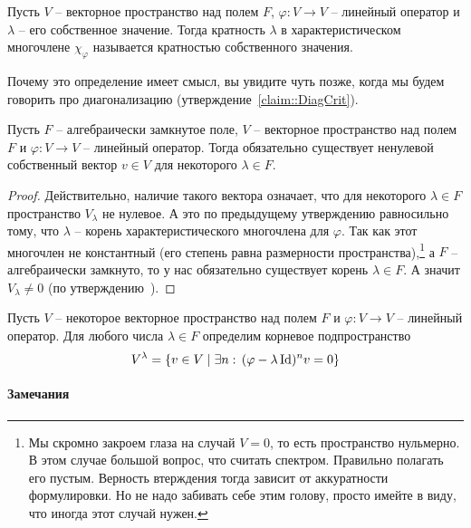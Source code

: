 \begin{definition}
Пусть $V$ -- векторное пространство над полем $F$, $\varphi\colon V\to V$ -- линейный оператор и $\lambda$ -- его собственное значение. Тогда кратность $\lambda$ в характеристическом многочлене $\chi_\varphi$ называется кратностью собственного значения.
\end{definition}

Почему это определение имеет смысл, вы увидите чуть позже, когда мы будем говорить про диагонализацию (утверждение~\ref{claim::DiagCrit}).


\begin{claim}
Пусть $F$ -- алгебраически замкнутое поле, $V$ -- векторное пространство над полем $F$ и $\varphi\colon V\to V$ -- линейный оператор. Тогда обязательно существует ненулевой собственный вектор $v\in V$ для некоторого $\lambda\in F$.
\end{claim}
\begin{proof}
Действительно, наличие такого вектора означает, что для некоторого $\lambda\in F$ пространство $V_\lambda$ не нулевое. А это по предыдущему утверждению равносильно тому, что $\lambda$ -- корень характеристического многочлена для $\varphi$. Так как этот многочлен не константный (его степень равна размерности пространства),\footnote{Мы скромно закроем глаза на случай $V = 0$, то есть пространство нульмерно. В этом случае большой вопрос, что считать спектром. Правильно полагать его пустым. Верность втерждения тогда зависит от аккуратности формулировки. Но не надо забивать себе этим голову, просто имейте в виду, что иногда этот случай нужен.} а $F$ -- алгебраически замкнуто, то у нас обязательно существует корень $\lambda\in F$. А значит $V_\lambda \neq 0$ (по утверждению~\label{claim::EigenSpec}).
\end{proof}

\begin{definition}
Пусть $V$ -- некоторое векторное пространство над полем $F$ и $\varphi \colon V\to V$ -- линейный оператор. Для любого числа $\lambda \in F$ определим корневое подпространство
\[
V^\lambda = \{v\in V\mid \exists n:\,(\varphi - \lambda\operatorname{Id})^n v = 0\}
\]
\end{definition}

\paragraph{Замечания}

